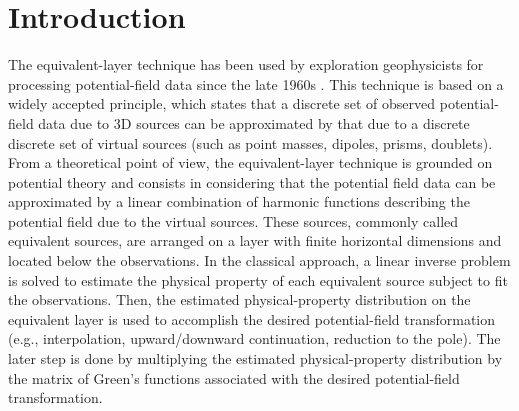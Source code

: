 \section{Introduction}

The equivalent-layer technique has been used by exploration geophysicists for processing potential-field data since the late 1960s 
\citep{dampney1969}. 
This technique is based on a widely accepted principle, which states that a discrete set of observed potential-field data due to 3D sources 
can be approximated by that due to a discrete discrete set of virtual sources (such as point 
masses, dipoles, prisms, doublets). From a theoretical point of view, the equivalent-layer 
technique is grounded on potential theory \citep{kellogg1967} and consists in considering 
that the potential field data can be approximated by a linear combination of harmonic 
functions describing the potential field due to the virtual sources. These sources, commonly 
called equivalent sources, are arranged on a layer with finite horizontal dimensions and 
located below the observations. In the classical approach, a linear inverse problem is 
solved to estimate the physical property of each equivalent source subject to fit the 
observations. Then, the estimated physical-property distribution on the equivalent layer is 
used to accomplish the desired potential-field transformation (e.g., interpolation, 
upward/downward continuation, reduction to the pole). The later step is done by multiplying 
the estimated physical-property distribution by the matrix of Green's functions associated 
with the desired potential-field transformation.

